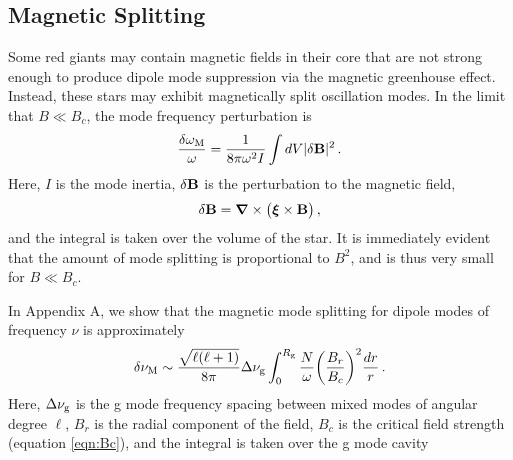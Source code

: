 \subsection{Magnetic Splitting}

Some red giants may contain magnetic fields in their core that are not strong enough to produce dipole mode suppression via the magnetic greenhouse effect. Instead, these stars may exhibit magnetically split oscillation modes. In the limit that $B \ll B_c$, the mode frequency perturbation is \citep{Unno_1989}
\begin{equation}
\label{eqn:dommag}
\frac{\delta \omega_{\rm M}}{\omega} = \frac{1}{8 \pi \omega^2 I} \int d V | \delta {\bf B} |^2 \, .
\end{equation}
Here, $I$ is the mode inertia,  $\delta {\bf B}$ is the perturbation to the magnetic field,
\begin{equation}
\label{eqn:dB}
\delta {\bf B} = {\boldsymbol \nabla} \times \big( {\boldsymbol \xi} \times {\bf B} \big) \, ,
\end{equation}
and the integral is taken over the volume of the star. It is immediately evident that the amount of mode splitting is proportional to $B^2$, and is thus very small for $B \ll B_c$.

In Appendix A, we show that the magnetic mode splitting for dipole modes of frequency $\nu$ is approximately
\begin{equation}
\label{eqn:dfmag}
\delta \nu_{\rm M} \sim \frac{\sqrt{\ell(\ell+1)}}{8 \pi} \Delta \nu_{\rm g} \int^{R_{\rm g}}_0 \frac{N}{\omega} \bigg(\frac{B_r}{B_c}\bigg)^2 \frac{dr}{r} \, .
\end{equation}
Here, $\Delta \nu_{\rm g}$ is the g mode frequency spacing between mixed modes of angular degree $\ell$, $B_r$ is the radial component of the field, $B_c$ is the critical field strength (equation \ref{eqn:Bc}), and the integral is taken over the g mode cavity

